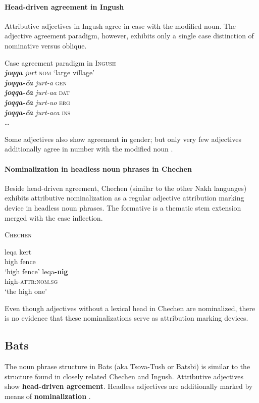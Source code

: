 \paragraph{Head-driven agreement in Ingush}
Attributive adjectives in Ingush agree in case with the modified noun. The adjective agreement paradigm, however, exhibits only a single case distinction of nominative versus oblique.
\begin{exe}
\ex Case agreement paradigm in \textsc{Ingush} \citep[99]{nichols1994b}\\
\textit{\textbf{joqqa} jurt} \textsc{nom} ‘large village’\\
\textit{\textbf{joqqa-ča} jurt-a} \textsc{gen}\\
\textit{\textbf{joqqa-ča} jurt-aa} \textsc{dat}\\
\textit{\textbf{joqqa-ča} jurt-uo} \textsc{erg}\\
\textit{\textbf{joqqa-ča} jurt-aca} \textsc{ins}\\
\dots \label{ingush agr}
\end{exe}
Some adjectives also show agreement in gender; but only very few adjectives additionally agree in number with the modified noun \citep[99]{nichols1994b}.

\paragraph{Nominalization in headless noun phrases in Chechen}
Beside head-driven agreement, Chechen (similar to the other Nakh languages) exhibits attributive nominalization as a regular adjective attribution marking device in headless noun phrases. The formative is a thematic stem extension merged with the case inflection.
\begin{exe}
\ex \textsc{Chechen} \citep[29]{nichols1994a}
\begin{xlist}
\ex
\gll	leqa kert\\
	high fence\\
\glt	‘high fence’
\ex	
\gll	leqa\textbf{-nig}\\
	high-\textsc{attr:nom.sg}\\
\glt	‘the high one’
\end{xlist}
\end{exe}
Even though adjectives without a lexical head in Chechen are nominalized, there is no evidence that these nominalizations serve as attribution marking devices.

\subsection{Bats}
The noun phrase structure in Bats (aka Tsova-Tush or Batsbi) is similar to the structure found in closely related Chechen and Ingush. Attributive adjectives show \textbf{head-driven agreement}. Headless adjectives are additionally marked by means of \textbf{nominalization} \cite[172–172]{holisky-etal1994}.

